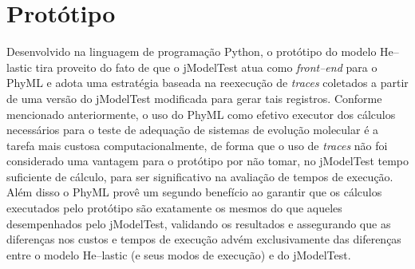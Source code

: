 \documentclass[english,brazilian]{UNISINOSmonografia} %
\begin{document}
%














\section{Protótipo}


Desenvolvido na linguagem de programação Python, o protótipo do modelo \textsf{He}--lastic tira proveito do fato de que o jModelTest atua como \textit{front--end} para o PhyML e adota uma estratégia baseada na reexecução de \textit{traces} coletados a partir de uma versão do jModelTest modificada para gerar tais registros.
%
Conforme mencionado anteriormente, o uso do PhyML como efetivo executor dos cálculos necessários para o teste de adequação de sistemas de evolução molecular é a tarefa mais custosa computacionalmente, de forma que o uso de \textit{traces} não foi considerado uma vantagem para o protótipo por não tomar, no jModelTest tempo suficiente de cálculo, para ser significativo na avaliação de tempos de execução.
%
Além disso o PhyML provê um segundo benefício ao garantir que os cálculos executados pelo protótipo são exatamente os mesmos do que aqueles desempenhados pelo jModelTest, validando os resultados e assegurando que as diferenças nos custos e tempos de execução advém exclusivamente das diferenças entre o modelo \textsf{He}--lastic (e seus modos de execução) e do jModelTest.
\end{document}
